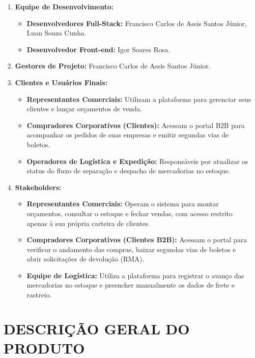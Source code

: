 \documentclass[12pt,a4paper]{article}
\begin{document}
\begin{enumerate}
  \item \textbf{Equipe de Desenvolvimento:}
    \begin{itemize}
      \item \textbf{Desenvolvedores Full-Stack:} Francisco Carlos de Assis Santos Júnior, Luan Souza Cunha.
      \item \textbf{Desenvolvedor Front-end:} Igor Soares Rosa.
    \end{itemize}

  \item \textbf{Gestores de Projeto:} Francisco Carlos de Assis Santos Júnior.

  \item \textbf{Clientes e Usuários Finais:}
    \begin{itemize}
      \item \textbf{Representantes Comerciais:} Utilizam a plataforma para gerenciar seus clientes e lançar orçamentos de venda.
      \item \textbf{Compradores Corporativos (Clientes):} Acessam o portal B2B para acompanhar os pedidos de suas empresas e emitir segundas vias de boletos.
      \item \textbf{Operadores de Logística e Expedição:} Responsáveis por atualizar os status do fluxo de separação e despacho de mercadorias no estoque.
    \end{itemize}

  \item \textbf{Stakeholders:}
    \begin{itemize}
      \item \textbf{Representantes Comerciais:} Operam o sistema para montar orçamentos, consultar o estoque e fechar vendas, com acesso restrito apenas à sua própria carteira de clientes.
      \item \textbf{Compradores Corporativos (Clientes B2B):} Acessam o portal para verificar o andamento das compras, baixar segundas vias de boletos e abrir solicitações de devolução (RMA).
      \item \textbf{Equipe de Logística:} Utiliza a plataforma para registrar o avanço das mercadorias no estoque e preencher manualmente os dados de frete e rastreio.
    \end{itemize}
\end{enumerate}

\section{DESCRIÇÃO GERAL DO PRODUTO}
\end{document}
